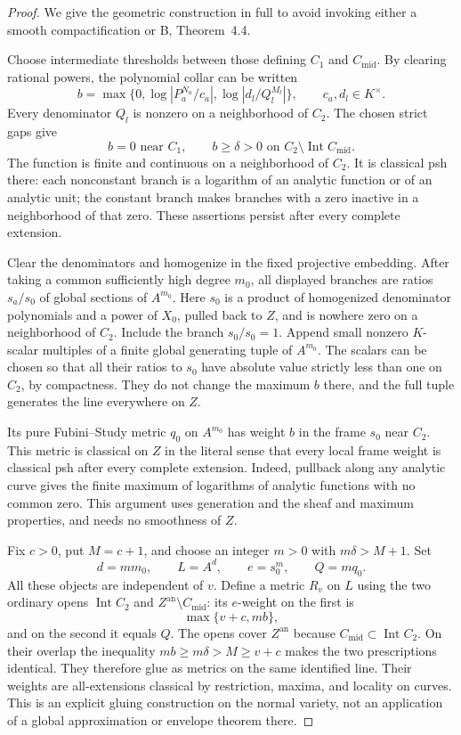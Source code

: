 \documentclass[11pt,a4paper]{article}
\numberwithin{equation}{section}
\theoremstyle{definition}
\theoremstyle{remark}
\begin{document}
\begin{proof}
We give the geometric construction in full to avoid invoking either a
smooth compactification or \textup{B}, Theorem~4.4.

Choose intermediate thresholds between those defining $C_1$ and
$C_{\mathrm{mid}}$. By clearing rational powers, the polynomial
collar can be written
\[
 b=\max\{0,\log|P_a^{N_a}/c_a|,
                       \log|d_l/Q_l^{M_l}|\},
 \qquad c_a,d_l\in K^\times.
\]
Every denominator $Q_l$ is nonzero on a neighborhood of $C_2$.
The chosen strict gaps give
\[
 b=0\text{ near }C_1,
 \qquad b\geq\delta>0\text{ on }C_2\setminus\operatorname{Int}
                                    C_{\mathrm{mid}}.
\]
The function is finite and continuous on a neighborhood of $C_2$.
It is classical psh there: each nonconstant branch is a logarithm of
an analytic function or of an analytic unit; the constant branch
makes branches with a zero inactive in a neighborhood of that zero.
These assertions persist after every complete extension.

Clear the denominators and homogenize in the fixed projective
embedding. After taking a common sufficiently high degree $m_0$,
all displayed branches are ratios $s_a/s_0$ of global sections of
$A^{m_0}$. Here $s_0$ is a product of homogenized denominator
polynomials and a power of $X_0$, pulled back to $Z$, and is nowhere
zero on a neighborhood of $C_2$. Include the branch $s_0/s_0=1$.
Append small nonzero $K$-scalar multiples of a finite global
generating tuple of $A^{m_0}$. The scalars can be chosen so that
all their ratios to $s_0$ have absolute value strictly less than one
on $C_2$, by compactness. They do not change the maximum $b$ there,
and the full tuple generates the line everywhere on $Z$.

Its pure Fubini--Study metric $q_0$ on $A^{m_0}$ has weight $b$
in the frame $s_0$ near $C_2$. This metric is classical on $Z$ in
the literal sense that every local frame weight is classical psh
after every complete extension. Indeed, pullback along any analytic
curve gives the finite maximum of logarithms of analytic functions
with no common zero. This argument uses generation and the sheaf
and maximum properties, and needs no smoothness of $Z$.

Fix $c>0$, put $M=c+1$, and choose an integer $m>0$ with
$m\delta>M+1$. Set
\[
 d=mm_0,\qquad L=A^d,\qquad e=s_0^m,\qquad Q=mq_0.
\]
All these objects are independent of $v$. Define a metric $R_v$ on
$L$ using the two ordinary opens
$\operatorname{Int}C_2$ and $Z^{\mathrm{an}}\setminus C_{\mathrm{mid}}$:
its $e$-weight on the first is
\[
 \max\{v+c,mb\},
\]
and on the second it equals $Q$. The opens cover $Z^{\mathrm{an}}$
because $C_{\mathrm{mid}}\subset\operatorname{Int}C_2$. On their
overlap the inequality $mb\geq m\delta>M\geq v+c$ makes the two
prescriptions identical. They therefore glue as metrics on the same
identified line. Their weights are all-extensions classical by
restriction, maxima, and locality on curves. This is an explicit
gluing construction on the normal variety, not an application of a
global approximation or envelope theorem there.


\end{proof}
\end{document}
